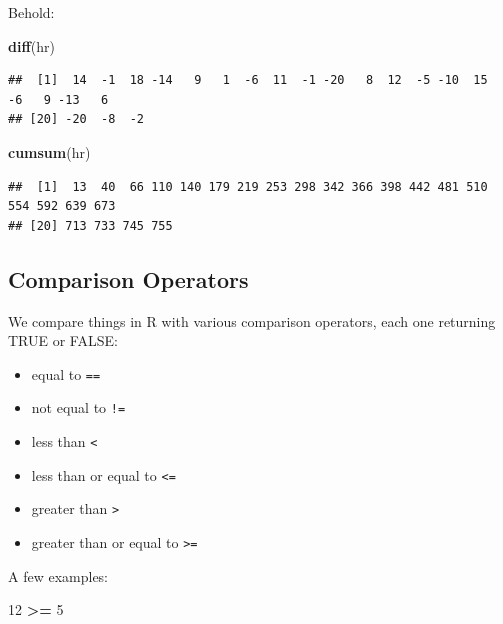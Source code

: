 \documentclass[
]{book}
\newenvironment{Shaded}{\begin{snugshade}}{\end{snugshade}}
\newcommand{\DecValTok}[1]{\textcolor[rgb]{0.00,0.00,0.81}{#1}}
\newcommand{\FunctionTok}[1]{\textcolor[rgb]{0.13,0.29,0.53}{\textbf{#1}}}
\newcommand{\NormalTok}[1]{#1}
\newcommand{\SpecialCharTok}[1]{\textcolor[rgb]{0.81,0.36,0.00}{\textbf{#1}}}
\providecommand{\tightlist}{%
  \setlength{\itemsep}{0pt}\setlength{\parskip}{0pt}}
\theoremstyle{definition}
\theoremstyle{definition}
\theoremstyle{definition}
\theoremstyle{definition}
\theoremstyle{remark}
\begin{document}
Behold:

\begin{Shaded}
\begin{Highlighting}[]
\FunctionTok{diff}\NormalTok{(hr)}
\end{Highlighting}
\end{Shaded}

\begin{verbatim}
##  [1]  14  -1  18 -14   9   1  -6  11  -1 -20   8  12  -5 -10  15  -6   9 -13   6
## [20] -20  -8  -2
\end{verbatim}

\begin{Shaded}
\begin{Highlighting}[]
\FunctionTok{cumsum}\NormalTok{(hr)}
\end{Highlighting}
\end{Shaded}

\begin{verbatim}
##  [1]  13  40  66 110 140 179 219 253 298 342 366 398 442 481 510 554 592 639 673
## [20] 713 733 745 755
\end{verbatim}

\subsection*{Comparison Operators}\label{comparison-operators}

We compare things in R with various comparison operators, each one returning TRUE or FALSE:

\begin{itemize}
\tightlist
\item
  equal to \texttt{==}
\item
  not equal to \texttt{!=}
\item
  less than \texttt{\textless{}}
\item
  less than or equal to \texttt{\textless{}=}
\item
  greater than \texttt{\textgreater{}}
\item
  greater than or equal to \texttt{\textgreater{}=}
\end{itemize}

A few examples:

\begin{Shaded}
\begin{Highlighting}[]
\DecValTok{12} \SpecialCharTok{\textgreater{}=} \DecValTok{5}
\end{Highlighting}
\end{Shaded}
\end{document}
